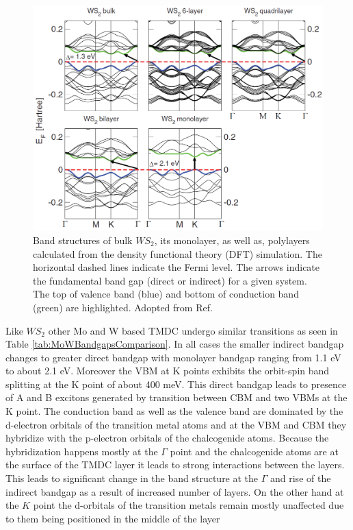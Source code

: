 \documentclass[12pt]{article}
\begin{document}
	\begin{figure}[h]
	\begin{center}
	\includegraphics[scale=0.4]{WS2BandStructureSimulation.png}
	\caption{Band structures of bulk $WS_2$, its monolayer, as well as, polylayers calculated from the density functional theory (DFT) simulation. The horizontal dashed lines indicate the Fermi level. The arrows indicate the fundamental band gap (direct or indirect) for a given system. The top of valence band (blue) and bottom of conduction band (green) are highlighted. Adopted from Ref. \cite{WS2BandStructureSimulation}}
	\label{fig:WS2BandStructureSimulation}
	\end{center}
	\end{figure}
	
	Like $WS_2$ other Mo and W based TMDC undergo similar transitions as seen in Table \ref{tab:MoWBandgapsComparison}. In all cases the smaller indirect bandgap changes to greater direct bandgap with monolayer bandgap ranging from 1.1 eV to about 2.1 eV. Moreover the VBM at K points exhibits the orbit-spin band splitting at the K point of about 400 meV. This direct bandgap leads to presence of A and B excitons generated by transition between CBM and two VBMs at the K point. The conduction band as well as the valence band are dominated by the d-electron orbitals of the transition metal atoms and at the VBM and CBM they hybridize with the p-electron orbitals of the chalcogenide atoms. Because the hybridization happens mostly at the $\Gamma$ point and the chalcogenide atoms are at the surface of the TMDC layer it leads to strong interactions between the layers. This leads to significant change in the band structure at the $\Gamma$ and rise of the indirect bandgap as a result of increased number of layers. On the other hand at the $K$ point the d-orbitals of the transition metals remain mostly unaffected due to them being positioned in the middle of the layer \cite{WS2BandStructureSimulation} \cite{EmergingPhotoluminescenceInMonolayerMoS2}
	 
\end{document}
